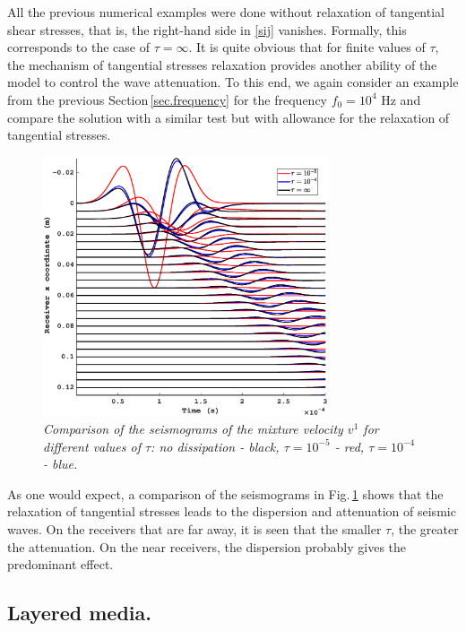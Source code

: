 \documentclass[3p,times,table]{article}
\begin{document}
All the previous numerical examples were done without relaxation of tangential 
shear stresses, that is, the right-hand side in \eqref{sij} vanishes. Formally, 
this corresponds to the case of $\tau=\infty$. It is quite obvious that for 
finite values of
$ \tau $, the mechanism of tangential stresses relaxation provides 
another ability of the model to 
control the wave attenuation. To this end, we again 
consider an 
example from the previous Section\,\ref{sec.frequency} for the frequency 
$f_0=10^{4}$ Hz and compare 
the solution with a similar test but with allowance for the relaxation of 
tangential stresses.
\begin{figure}[!htbp]
	\begin{center}
\includegraphics[draft=false,width=0.75\textwidth]{Figures/Compare_dissip_10_4}
	\end{center}
	\caption{{\footnotesize \it  
	Comparison of the seismograms of the mixture velocity $v^1$  for different 
	values of $\tau$:
	no dissipation - black, $\tau=10^{-5}$ - red, $\tau=10^{-4}$ - blue.}}
	\label{fig: Compare_dissip}
\end{figure}
As one would expect, a comparison of the seismograms in Fig.\,\ref{fig: Compare_dissip} shows that the relaxation of tangential stresses leads to the dispersion and attenuation of seismic waves. On the receivers that are far away, it is seen that the smaller $\tau$, the greater the attenuation. On the near receivers, the dispersion probably gives the predominant effect.


\subsection{Layered media.}
\end{document}
